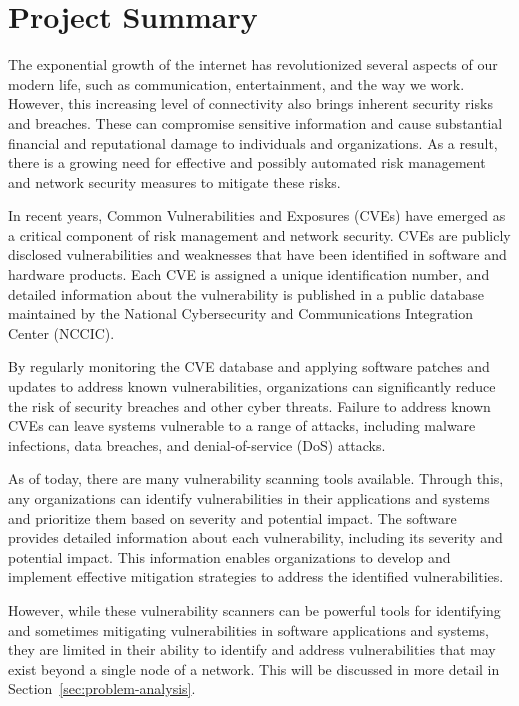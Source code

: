 \section{Project Summary}

The exponential growth of the internet has revolutionized several aspects of our modern life, such as communication, entertainment, and the way we work. However, this increasing level of connectivity also brings inherent security risks and breaches. These can compromise sensitive information and cause substantial financial and reputational damage to individuals and organizations. As a result, there is a growing need for effective and possibly automated risk management and network security measures to mitigate these risks.


In recent years, Common Vulnerabilities and Exposures (CVEs) have emerged as a critical component of risk management and network security. CVEs are publicly disclosed vulnerabilities and weaknesses that have been identified in software and hardware products. Each CVE is assigned a unique identification number, and detailed information about the vulnerability is published in a public database maintained by the National Cybersecurity and Communications Integration Center (NCCIC).

By regularly monitoring the CVE database and applying software patches and updates to address known vulnerabilities, organizations can significantly reduce the risk of security breaches and other cyber threats. Failure to address known CVEs can leave systems vulnerable to a range of attacks, including malware infections, data breaches, and denial-of-service (DoS) attacks.

As of today, there are many vulnerability scanning tools available. Through this, any organizations can identify vulnerabilities in their applications and systems and prioritize them based on severity and potential impact. The software provides detailed information about each vulnerability, including its severity and potential impact. This information enables organizations to develop and implement effective mitigation strategies to address the identified vulnerabilities.

However, while these vulnerability scanners can be powerful tools for identifying and sometimes mitigating vulnerabilities in software applications and systems, they are limited in their ability to identify and address vulnerabilities that may exist beyond a single node of a network. This will be discussed in more detail in Section~\ref{sec:problem-analysis}.

